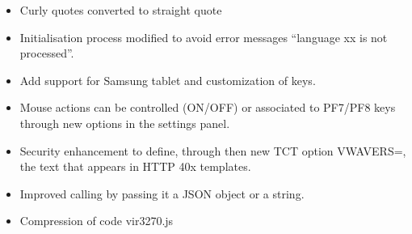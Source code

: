 \documentclass[letterpaper,10pt,english]{sphinxmanual}
\begin{document}
\sphinxAtStartPar
{}
\begin{itemize}
\item {} 
\sphinxAtStartPar
Curly quotes converted to straight quote

\end{itemize}

\sphinxAtStartPar
{}
\begin{itemize}
\item {} 
\sphinxAtStartPar
Initialisation process modified to avoid error messages \sphinxhyphen{} “language xx is not processed”.

\end{itemize}

\sphinxAtStartPar
{}
\begin{itemize}
\item {} 
\sphinxAtStartPar
Add support for Samsung tablet and customization of keys.

\end{itemize}

\sphinxAtStartPar
{}
\begin{itemize}
\item {} 
\sphinxAtStartPar
Mouse actions can be controlled (ON/OFF) or associated to PF7/PF8 keys through new options in the settings panel.

\end{itemize}

\sphinxAtStartPar
{}
\begin{itemize}
\item {} 
\sphinxAtStartPar
Security enhancement to define, through then new TCT option VWAVERS=, the text that appears in HTTP 40x templates.

\end{itemize}

\sphinxAtStartPar
{}
\begin{itemize}
\item {} 
\sphinxAtStartPar
Improved calling by passing it a JSON object or a string.

\item {} 
\sphinxAtStartPar
Compression of code vir3270.js

\end{itemize}
\end{document}
